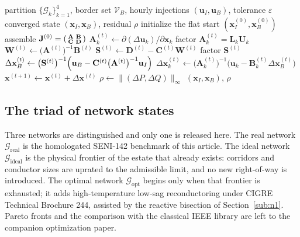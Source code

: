 \begin{algorithm}[!t]
\caption{Schur-border AC power flow on the SENI-142 HBCF partition}
\label{alg:schur_pf}
\begin{algorithmic}[1]
\Require partition $\{\mathcal{G}_k\}_{k=1}^{4}$, border set $\mathcal{V}_B$,
         hourly injections $(\mathbf{u}_I, \mathbf{u}_B)$, tolerance $\varepsilon$
\Ensure converged state $(\mathbf{x}_I, \mathbf{x}_B)$, residual $\rho$
\State initialize the flat start $(\mathbf{x}_I^{(0)}, \mathbf{x}_B^{(0)})$
\State assemble $\mathbf{J}^{(0)} = \begin{psmallmatrix} \mathbf{A} & \mathbf{B} \\ \mathbf{C} & \mathbf{D} \end{psmallmatrix}$
   
     \State $\mathbf{A}_k^{(t)} \gets \partial (\Delta \mathbf{u}_k) / \partial \mathbf{x}_k$
     \State factor $\mathbf{A}_k^{(t)} = \mathbf{L}_k \mathbf{U}_k$ 
  \EndFor
  \State $\mathbf{W}^{(t)} \gets \bigl(\mathbf{A}^{(t)}\bigr)^{-1} \mathbf{B}^{(t)}$ 
  \State $\mathbf{S}^{(t)} \gets \mathbf{D}^{(t)} - \mathbf{C}^{(t)} \mathbf{W}^{(t)}$
  \State factor $\mathbf{S}^{(t)}$
  \State $\Delta \mathbf{x}_B^{(t)} \gets \bigl(\mathbf{S}^{(t)}\bigr)^{-1} \Bigl( \mathbf{u}_B - \mathbf{C}^{(t)} \bigl(\mathbf{A}^{(t)}\bigr)^{-1} \mathbf{u}_I \Bigr)$
   
     \State $\Delta \mathbf{x}_k^{(t)} \gets \bigl(\mathbf{A}_k^{(t)}\bigr)^{-1} \bigl( \mathbf{u}_k - \mathbf{B}_k^{(t)} \Delta \mathbf{x}_B^{(t)} \bigr)$
  \EndFor
  \State $\mathbf{x}^{(t+1)} \gets \mathbf{x}^{(t)} + \Delta \mathbf{x}^{(t)}$
  \State $\rho \gets \lVert (\Delta P, \Delta Q) \rVert_{\infty}$
\EndFor
\State \Return $(\mathbf{x}_I, \mathbf{x}_B)$, $\rho$ 
\end{algorithmic}
\end{algorithm}

\subsection{The triad of network states}
\label{sub:triad}

Three networks are distinguished and only one is released here. The real network $\mathcal{G}_{\mathrm{real}}$ is the homologated SENI-142 benchmark of this article. The ideal network $\mathcal{G}_{\mathrm{ideal}}$ is the physical frontier of the estate that already exists: corridors and conductor sizes are uprated to the admissible limit, and no new right-of-way is introduced. The optimal network $\mathcal{G}_{\mathrm{opt}}$ begins only when that frontier is exhausted; it adds high-temperature low-sag reconductoring under CIGRE Technical Brochure 244, assisted by the reactive bisection of Section~\ref{sub:n1}. Pareto fronts and the comparison with the classical IEEE library are left to the companion optimization paper.

